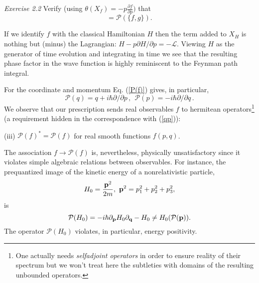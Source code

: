 \documentclass[12pt]{article}
\begin{document}
{\it Exercise 2.2} Verify (using $\theta(X_f) = 
-p\frac{\partial f}{\partial p})$ that
\begin{equation}
[{\mathcal P}(f), {\mathcal P}(g)] = {\mathcal P}(\{f, g\}).
\end{equation}

If we identify $f$ with the classical Hamiltonian $H$ then the term added to
$X_H$ is nothing but (minus) the Lagrangian: $H - p\partial{H}/\partial{p} =
-\mathcal{L}$. Viewing $H$ as the generator of time evolution and integrating in
 time we see that the resulting phase factor in the wave function is highly
reminiscent to the Feynman path integral.

For the coordinate and momentum Eq. (\ref{P(f)}) gives, in particular,
\begin{equation}
\label{Pqp}
{\mathcal P}(q) = q + i\hbar \partial/\partial{p}\,, \ \ {\mathcal P}(p) =
-i \hbar \partial/\partial{q}\,.
\end{equation}
We observe that our prescription sends real observables $f$ to hermitean
operators\footnote{One actually needs {\it selfadjoint operators} in order
to ensure reality of their spectrum but we won't treat here the subtleties
with domains of the resulting unbounded operators.} (a requirement hidden
in the correspondence with (\ref{qp})):

(iii) ${\mathcal P}(f)^* = {\mathcal P}(f)$ for real smooth functions $f(p, q)$.

The association $f \rightarrow {\mathcal P}(f)$ is,
nevertheless, physically unsatisfactory since it violates simple algebraic
relations between observables. For instance, the prequantized image of the
kinetic energy of a nonrelativistic particle,
\begin{equation}
\label{H0}
H_0 = \frac{{\bf p}^2}{2m}, \, \, {\bf p}^2 = p_1^2 + p_2^2 + p_3^2,
\end{equation}
is
\begin{equation}
\label{PH0}
{\mathcal P}(H_0) = -i\hbar {\bf \partial}_{\bf p} H_0 {\bf \partial}_{\bf q} -
H_0 \neq H_0({\mathcal P}({\bf p})).
\end{equation}
The operator ${\mathcal P}(H_0)$ violates, in particular, energy positivity.
\end{document}
